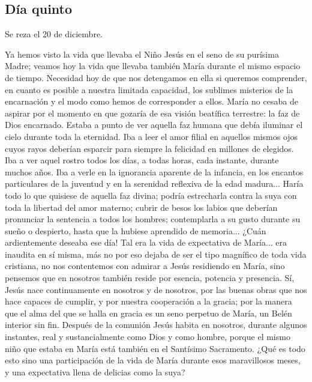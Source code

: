 \documentclass[spanish,utf8,twocolumn]{chlart}
\newenvironment{summary}{\begingroup
	\small\sffamily\itshape%
	\setlength{\leftskip}{3em}\setlength{\rightskip}{3em}\noindent
	}{\par\endgroup}
\newenvironment{lectura}{\begingroup\color{lector}}{\endgroup\par}
\begin{document}
\subsection*{Día quinto}
\begin{summary}
Se reza el 20 de diciembre.
\end{summary}
\begin{lectura}
Ya hemos visto la vida que llevaba el Niño Jesús en el seno de su
purísima Madre; veamos hoy la vida que llevaba también María durante el
mismo espacio de tiempo.
Necesidad hoy de que nos detengamos en ella si queremos comprender, en
cuanto es posible a nuestra limitada capacidad, los sublimes misterios
de la encarnación y el modo como hemos de corresponder a ellos.
María no cesaba de aspirar por el momento en que gozaría de esa visión
beatífica terrestre:
la faz de Dios encarnado.
Estaba a punto de ver aquella faz humana que debía iluminar el cielo
durante toda la eternidad.
Iba a leer el amor filial en aquellos mismos ojos cuyos rayos deberían
esparcir para siempre la felicidad en millones de elegidos.
Iba a ver aquel rostro todos los días, a todas horas, cada instante,
durante muchos años.
Iba a verle en la ignorancia aparente de la infancia, en los encantos
particulares de la juventud y en la serenidad reflexiva de la edad
madura...
Haría todo lo que quisiese de aquella faz divina; podría estrecharla
contra la suya con toda la libertad del amor materno; cubrir de besos
los labios que deberían pronunciar la sentencia a todos los hombres;
contemplarla a su gusto durante su sueño o despierto, hasta que la
hubiese aprendido de memoria...
¿Cuán ardientemente deseaba ese día!
Tal era la vida de expectativa de María...
era inaudita en sí misma, más no por eso dejaba de ser el tipo magnífico
de toda vida cristiana, no nos contentemos con admirar a Jesús
residiendo en María, sino pensemos que en nosotros también reside por
esencia, potencia y presencia.
Sí, Jesús nace continuamente en nosotros y de nosotros, por las buenas
obras que nos hace capaces de cumplir, y por nuestra cooperación a la
gracia; por la manera que el alma del que se halla en gracia es un seno
perpetuo de María, un Belén interior sin fin.
Después de la comunión Jesús habita en nosotros, durante algunos
instantes, real y sustancialmente como Dios y como hombre, porque el
mismo niño que estaba en María está también en el Santísimo Sacramento.
¿Qué es todo esto sino una participación de la vida de María durante
esos maravillosos meses, y una expectativa llena de delicias como la
suya?
\end{lectura}
\end{document}
